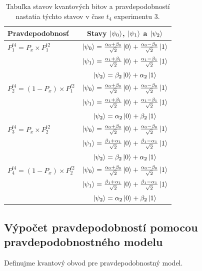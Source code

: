 \begin{table}
\centering
\begin{tabular}{|l|c|}
\hline
\textbf{Pravdepodobnosť} & \textbf{Stavy \(\ket{\psi_0}\), \(\ket{\psi_1}\) a \(\ket{\psi_2}\)} \\
\hline
\(P^{t4}_1 = P_x \times P^{t2}_1\) & 
\(\ket{\psi_0} = \frac{\alpha_0 + \beta_0}{\sqrt{2}}\ket{0} + \frac{\alpha_0 - \beta_0}{\sqrt{2}}\ket{1}\) \\
& \(\ket{\psi_1} = \frac{\alpha_1 + \beta_1}{\sqrt{2}}\ket{0} + \frac{\alpha_1 - \beta_1}{\sqrt{2}}\ket{1}\) \\
& \(\ket{\psi_2} = \beta_2\ket{0} + \alpha_2\ket{1}\) \\
\hline

\(P^{t4}_2 = (1-P_x) \times P^{t2}_1\) & 
\(\ket{\psi_0} = \frac{\alpha_0 + \beta_0}{\sqrt{2}}\ket{0} + \frac{\alpha_0 - \beta_0}{\sqrt{2}}\ket{1}\) \\
& \(\ket{\psi_1} = \frac{\alpha_1 + \beta_1}{\sqrt{2}}\ket{0} + \frac{\alpha_1 - \beta_1}{\sqrt{2}}\ket{1}\) \\
& \(\ket{\psi_2} = \alpha_2\ket{0} + \beta_2\ket{1}\) \\
\hline

\(P^{t4}_3 = P_x \times P^{t2}_2\) & 
\(\ket{\psi_0} = \frac{\alpha_0 + \beta_0}{\sqrt{2}}\ket{0} + \frac{\alpha_0 - \beta_0}{\sqrt{2}}\ket{1}\) \\
& \(\ket{\psi_1} = \frac{\beta_1 + \alpha_1}{\sqrt{2}}\ket{0} + \frac{\beta_1 - \alpha_1}{\sqrt{2}}\ket{1}\) \\
& \(\ket{\psi_2} = \beta_2\ket{0} + \alpha_2\ket{1}\) \\
\hline

\(P^{t4}_4 = (1-P_x) \times P^{t2}_2\) & 
\(\ket{\psi_0} = \frac{\alpha_0 + \beta_0}{\sqrt{2}}\ket{0} + \frac{\alpha_0 - \beta_0}{\sqrt{2}}\ket{1}\) \\
& \(\ket{\psi_1} = \frac{\beta_1 + \alpha_1}{\sqrt{2}}\ket{0} + \frac{\beta_1 - \alpha_1}{\sqrt{2}}\ket{1}\) \\
& \(\ket{\psi_2} = \alpha_2\ket{0} + \beta_2\ket{1}\) \\
\hline
\end{tabular}

\caption{\label{expr3_t4_states} Tabuľka stavov kvantových bitov a
 pravdepodobností
nastatia týchto stavov v čase \(t_4\) experimentu 3.}
\end{table}

\subsection*{Výpočet pravdepodobností pomocou pravdepodobnostného modelu}
Definujme kvantový obvod pre pravdepodobnostný model.

